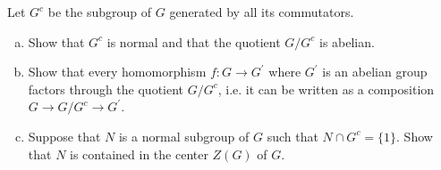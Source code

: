 \documentclass{article}
\newcounter{Problem}
\newenvironment{Problem}{\begin{Exercise}[name={Problem},
                                          counter={Problem}]}
                        {\end{Exercise}}
\begin{document}
\pagebreak

\begin{Problem}
Let $G^c$ be the subgroup of $G$ generated by all its commutators.

\begin{enumerate}[(a)]
  \item{Show that $G^c$ is normal and that the quotient $G / G^c$ is
        abelian.}
  \item{Show that every homomorphism $f : G \to G^\prime$ where
      $G^\prime$ is an abelian group factors through the quotient
      $G / G^c$, i.e. it can be written as a composition
      $G \to G / G^c \to G^\prime$.}
  \item{Suppose that $N$ is a normal subgroup of $G$ such that
      $N \cap G^c = \{ 1 \}$. Show that $N$ is contained in the center
      $Z(G)$ of $G$.}
\end{enumerate}
\end{Problem}
\end{document}
